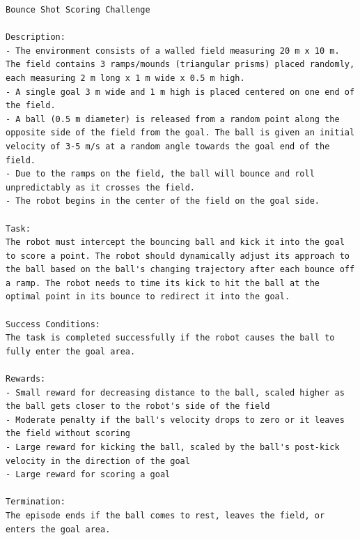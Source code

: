\begin{lstlisting}[language={}]
Bounce Shot Scoring Challenge

Description:
- The environment consists of a walled field measuring 20 m x 10 m. The field contains 3 ramps/mounds (triangular prisms) placed randomly, each measuring 2 m long x 1 m wide x 0.5 m high.  
- A single goal 3 m wide and 1 m high is placed centered on one end of the field.
- A ball (0.5 m diameter) is released from a random point along the opposite side of the field from the goal. The ball is given an initial velocity of 3-5 m/s at a random angle towards the goal end of the field.
- Due to the ramps on the field, the ball will bounce and roll unpredictably as it crosses the field.
- The robot begins in the center of the field on the goal side.

Task:
The robot must intercept the bouncing ball and kick it into the goal to score a point. The robot should dynamically adjust its approach to the ball based on the ball's changing trajectory after each bounce off a ramp. The robot needs to time its kick to hit the ball at the optimal point in its bounce to redirect it into the goal.

Success Conditions:
The task is completed successfully if the robot causes the ball to fully enter the goal area.

Rewards:
- Small reward for decreasing distance to the ball, scaled higher as the ball gets closer to the robot's side of the field
- Moderate penalty if the ball's velocity drops to zero or it leaves the field without scoring
- Large reward for kicking the ball, scaled by the ball's post-kick velocity in the direction of the goal
- Large reward for scoring a goal

Termination:
The episode ends if the ball comes to rest, leaves the field, or enters the goal area.
\end{lstlisting}
